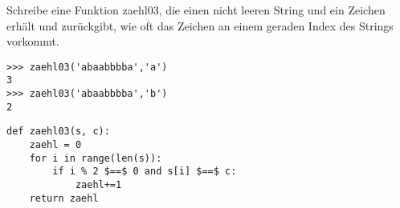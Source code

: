 \question[3] Schreibe eine Funktion zaehl03, die einen nicht leeren String und ein Zeichen
erhält und zurückgibt, wie oft das Zeichen an einem geraden Index des Strings vorkommt.
\begin{lstlisting}
>>> zaehl03('abaabbbba','a')
3
>>> zaehl03('abaabbbba','b')
2
\end{lstlisting}
\begin{solutionbox}{4cm}
\begin{lstlisting}
def zaehl03(s, c):
    zaehl = 0
    for i in range(len(s)):
        if i % 2 $==$ 0 and s[i] $==$ c:
            zaehl+=1
    return zaehl
\end{lstlisting}
\end{solutionbox}
